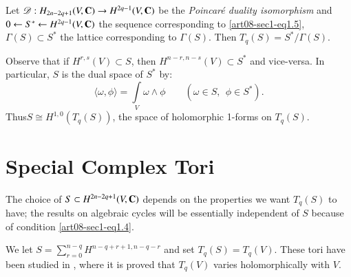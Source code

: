\begin{definition}\label{art08-sec1-defi3}
Let $\mathscr{D}:H_{2n-2q+1}(V,\mathbf{C})\to H^{2q-1}(V,\mathbf{C})$ be the {\em Poincar\'e duality isomorphism} and $0\leftarrow S^{*}\leftarrow H^{2q-1}(V,\mathbf{C})$ the sequence corresponding to \eqref{art08-sec1-eq1.5}, $\Gamma(S)\subset S^{*}$ the lattice corresponding to $\Gamma(S)$. Then $T_{q}(S)=S^{*}/\Gamma(S)$.
\end{definition}

Observe that if $H^{r,s}(V)\subset S$, then $H^{n-r,n-s}(V)\subset S^{*}$ and vice-versa. In particular, $S$ is the dual space of $S^{*}$ by:
\begin{equation}
\langle \omega,\phi\rangle =\int\limits_{V}\omega\wedge \phi\qquad (\omega\in S, \ \ \phi\in S^{*}).\label{art08-sec1-eq1.6}
\end{equation}
Thus\pageoriginale $S\cong H^{1,0}(T_{q}(S))$, the space of holomorphic 1-forms on $T_{q}(S)$.

\section{Special Complex Tori}\label{art08-sec2}

The choice of $S\subset H^{2n-2q+1}(V,\mathbf{C})$ depends on the properties we want $T_{q}(S)$ to have; the results on algebraic cycles will be essentially independent of $S$ because of condition \eqref{art08-sec1-eq1.4}.

\setcounter{definition}{0}
\begin{example}\label{art08-sec2-exam1}
We let $S=\sum\limits^{n-q}_{r=0}H^{n-q+r+1,n-q-r}$ and set $T_{q}(S)=T_{q}(V)$. These tori have been studied in \cite{art08-key9}, where it is proved that $T_{q}(V)$ varies holomorphically with $V$.
\end{example}

